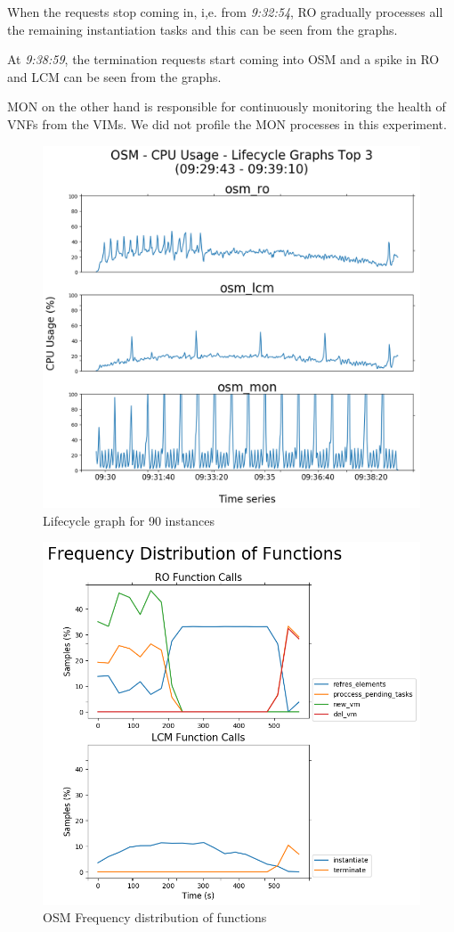 When the requests stop coming in, i,e. from \textit{9:32:54}, RO gradually processes all the remaining instantiation tasks and this can be seen from the graphs. 

At \textit{9:38:59}, the termination requests start coming into OSM and a spike in RO and LCM can be seen from the graphs.

MON on the other hand is responsible for continuously monitoring the health of VNFs from the VIMs. We did not profile the MON processes in this experiment.

\begin{figure}[h]
\centering
\includegraphics[width=1\linewidth]{figures/scalability_graphs/Lifecycle-Graphs-Top-3/OSM-TOP-3-Lifecycle-90}
\caption{Lifecycle graph for 90 instances}
\label{fig:osm-top-3-lifecycle-90}
\end{figure}

\begin{figure}[h]
\centering
\includegraphics[width=1\linewidth]{figures/scalability_graphs/Lifecycle-Graphs-Top-3/osm-frequency-dist}
\caption{OSM Frequency distribution of functions}
\label{fig:osm-frequency-dist}
\end{figure}
